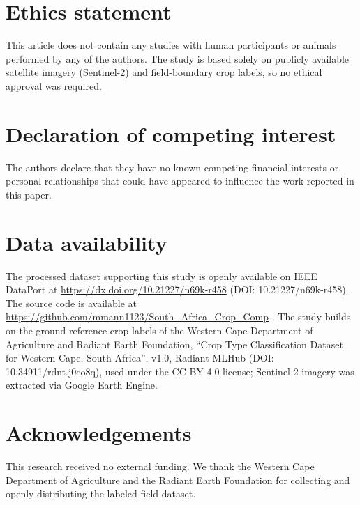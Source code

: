 \documentclass[preprint,authoryear]{elsarticle}
\begin{document}
\section*{Ethics statement}
This article does not contain any studies with human participants or animals performed by any of the authors. The study is based solely on publicly available satellite imagery (Sentinel-2) and field-boundary crop labels, so no ethical approval was required.

\section*{Declaration of competing interest}
The authors declare that they have no known competing financial interests or personal relationships that could have appeared to influence the work reported in this paper.

\section*{Data availability}
The processed dataset supporting this study is openly available on IEEE DataPort at \url{https://dx.doi.org/10.21227/n69k-r458} (DOI: 10.21227/n69k-r458). The source code is available at \url{https://github.com/mmann1123/South_Africa_Crop_Comp} \citep{primary_repo}. The study builds on the ground-reference crop labels of the Western Cape Department of Agriculture and Radiant Earth Foundation, ``Crop Type Classification Dataset for Western Cape, South Africa'', v1.0, Radiant MLHub (DOI: 10.34911/rdnt.j0co8q), used under the CC-BY-4.0 license; Sentinel-2 imagery was extracted via Google Earth Engine.

\section*{Acknowledgements}
This research received no external funding. We thank the Western Cape Department of Agriculture and the Radiant Earth Foundation for collecting and openly distributing the labeled field dataset.



\end{document}
